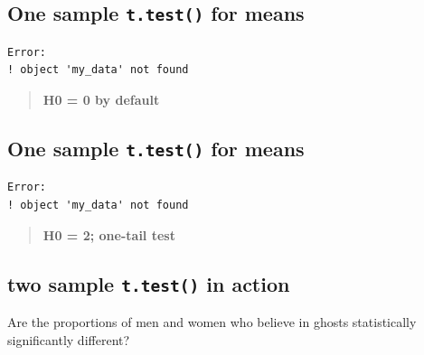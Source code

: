 \documentclass[
  letterpaper,
  DIV=11,
  numbers=noendperiod]{scrartcl}
\newenvironment{Shaded}{\begin{snugshade}}{\end{snugshade}}
\newcommand{\AttributeTok}[1]{\textcolor[rgb]{0.40,0.45,0.13}{#1}}
\newcommand{\CommentTok}[1]{\textcolor[rgb]{0.37,0.37,0.37}{#1}}
\newcommand{\DecValTok}[1]{\textcolor[rgb]{0.68,0.00,0.00}{#1}}
\newcommand{\FunctionTok}[1]{\textcolor[rgb]{0.28,0.35,0.67}{#1}}
\newcommand{\NormalTok}[1]{\textcolor[rgb]{0.00,0.23,0.31}{#1}}
\newcommand{\SpecialCharTok}[1]{\textcolor[rgb]{0.37,0.37,0.37}{#1}}
\newcommand{\StringTok}[1]{\textcolor[rgb]{0.13,0.47,0.30}{#1}}
\begin{document}
\subsection{\texorpdfstring{One sample \texttt{t.test()} for
means}{One sample t.test() for means}}\label{one-sample-t.test-for-means}

\begin{Shaded}
\end{Shaded}

\begin{verbatim}
Error:
! object 'my_data' not found
\end{verbatim}

\begin{quote}
\textbf{H0 = 0 by default}
\end{quote}

\subsection{\texorpdfstring{One sample \texttt{t.test()} for
means}{One sample t.test() for means}}\label{one-sample-t.test-for-means-1}

\begin{Shaded}
\end{Shaded}

\begin{verbatim}
Error:
! object 'my_data' not found
\end{verbatim}

\begin{quote}
\textbf{H0 = 2; one-tail test}
\end{quote}

\subsection{\texorpdfstring{two sample \texttt{t.test()} in
action}{two sample t.test() in action}}\label{two-sample-t.test-in-action}

Are the proportions of men and women who believe in ghosts statistically
significantly different?
\end{document}
